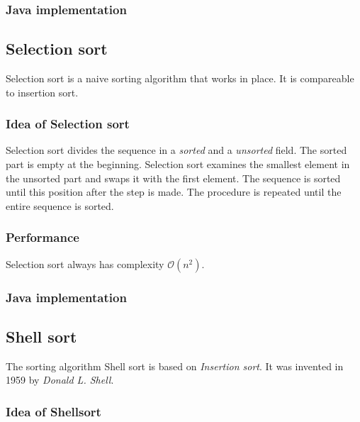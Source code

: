 \documentclass[]{pfBook}
\newcommand{\OO}{\mathcal{O}}
\begin{document}
	\subsubsection{Java implementation}
	
	
	
	\subsection{Selection sort}
	
	Selection sort is a naive sorting algorithm that works in place. It is compareable to insertion sort.
	
	\subsubsection{Idea of Selection sort}
	
	Selection sort divides the sequence in a \emph{sorted} and a \emph{unsorted} field. The sorted part is empty at the beginning. Selection sort examines the smallest element in the unsorted part and swaps it with the first element. The sequence is sorted until this position after the step is made. The procedure is repeated until the entire sequence is sorted.
	
	\subsubsection{Performance}
	
	Selection sort always has complexity $\OO(n^2)$.
	
	\subsubsection{Java implementation}
	
	
	
	\subsection{Shell sort}
	
	The sorting algorithm Shell sort is based on \emph{Insertion sort}. It was invented in 1959 by \emph{Donald L. Shell}.
	
	\subsubsection{Idea of Shellsort}
	
\end{document}
